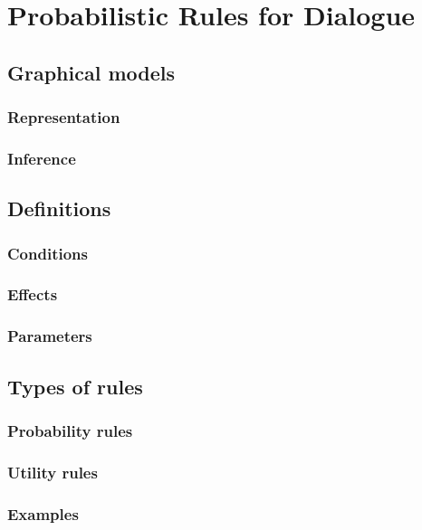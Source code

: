 \chapter{Probabilistic Rules for Dialogue}
\label{chap:rules}

\section{Graphical models}

\subsection{Representation}

\subsection{Inference}

\section{Definitions}

\subsection{Conditions}

\subsection{Effects}

\subsection{Parameters}

\section{Types of rules}

\subsection{Probability rules}

\subsection{Utility rules}

\subsection{Examples}

